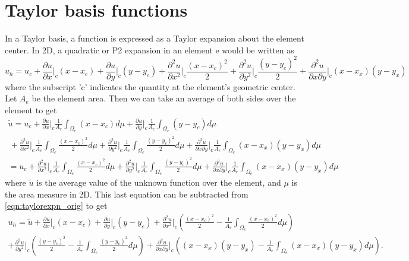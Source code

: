 \documentclass[11pt]{article}
\begin{document}
\section{Taylor basis functions}
In a Taylor basis, a function is expressed as a Taylor expansion about the element center. In 2D, a quadratic or P2 expansion in an element e would be written as
\begin{equation}
u_h = u_c + \frac{\partial u}{\partial x} \Big|_c(x-x_c) + \frac{\partial u}{\partial y} \Big|_c(y-y_c) + \frac{\partial^2 u}{\partial x^2} \Big|_c \frac{(x-x_c)^2}{2} + \frac{\partial^2 u}{\partial y^2} \Big|_c \frac{(y-y_c)^2}{2} + \frac{\partial^2 u}{\partial x\partial y} \Big|_c (x-x_x)(y-y_x)
\label{eqn:taylorexpn_orig}
\end{equation}
where the subscript 'c' indicates the quantity at the element's geometric center. Let $A_e$ be the element area. Then we can take an average of both sides over the element to get
\begin{multline}
\tilde{u} = u_c + \frac{\partial u}{\partial x} \Big|_c \frac{1}{A_e}\int_{\Omega_e}(x-x_c)d\mu + \frac{\partial u}{\partial y} \Big|_c \frac{1}{A_e}\int_{\Omega_e} (y-y_c)d\mu \\ \, + \frac{\partial^2 u}{\partial x^2} \Big|_c \frac{1}{A_e}\int_{\Omega_e} \frac{(x-x_c)^2}{2}d\mu + \frac{\partial^2 u}{\partial y^2} \Big|_c \frac{1}{A_e}\int_{\Omega_e} \frac{(y-y_c)^2}{2}d\mu + \frac{\partial^2 u}{\partial x\partial y} \Big|_c \frac{1}{A_e}\int_{\Omega_e} (x-x_x)(y-y_x)d\mu \\
= u_c + \frac{\partial^2 u}{\partial x^2} \Big|_c \frac{1}{A_e}\int_{\Omega_e} \frac{(x-x_c)^2}{2}d\mu + \frac{\partial^2 u}{\partial y^2} \Big|_c \frac{1}{A_e}\int_{\Omega_e} \frac{(y-y_c)^2}{2}d\mu + \frac{\partial^2 u}{\partial x\partial y} \Big|_c \frac{1}{A_e}\int_{\Omega_e} (x-x_x)(y-y_x)d\mu
\end{multline}
where $\tilde{u}$ is the average value of the unknown function over the element, and $\mu$ is the area measure in 2D. This last equation can be subtracted from \eqref{eqn:taylorexpn_orig} to get
\begin{multline}
u_h = \tilde{u} + \frac{\partial u}{\partial x} \Big|_c(x-x_c) + \frac{\partial u}{\partial y} \Big|_c(y-y_c) + \frac{\partial^2 u}{\partial x^2} \Big|_c \left( \frac{(x-x_c)^2}{2} - \frac{1}{A_e}\int_{\Omega_e} \frac{(x-x_c)^2}{2}d\mu \right) \\ + \frac{\partial^2 u}{\partial y^2} \Big|_c \left( \frac{(y-y_c)^2}{2} -\frac{1}{A_e}\int_{\Omega_e} \frac{(y-y_c)^2}{2}d\mu \right) + \frac{\partial^2 u}{\partial x\partial y} \Big|_c \left( (x-x_x)(y-y_x) - \frac{1}{A_e}\int_{\Omega_e} (x-x_x)(y-y_x)d\mu \right).
\label{eqn:taylorexpn}
\end{multline}
\end{document}
